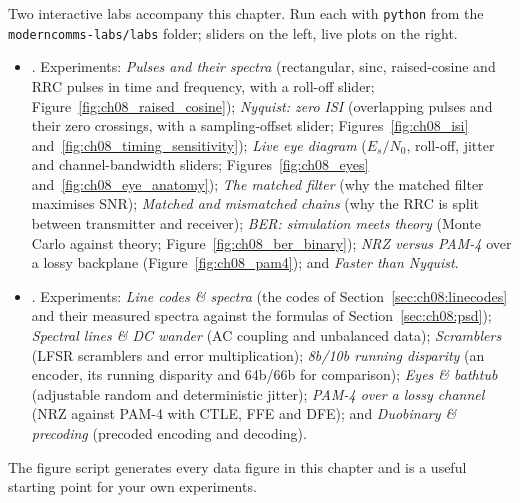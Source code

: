 \begin{labbox}
Two interactive labs accompany this chapter. Run each with \texttt{python} from the
\texttt{moderncomms-labs/labs} folder; sliders on the left, live plots on the right.
\begin{itemize}
\item {}. Experiments: \emph{Pulses and their
spectra} (rectangular, sinc, raised-cosine and RRC pulses in time and frequency, with a roll-off
slider; Figure~\ref{fig:ch08_raised_cosine}); \emph{Nyquist: zero ISI} (overlapping pulses and
their zero crossings, with a sampling-offset slider; Figures~\ref{fig:ch08_isi}
and~\ref{fig:ch08_timing_sensitivity}); \emph{Live eye diagram} ($E_s/N_0$, roll-off, jitter and
channel-bandwidth sliders; Figures~\ref{fig:ch08_eyes} and~\ref{fig:ch08_eye_anatomy});
\emph{The matched filter} (why the matched filter maximises SNR); \emph{Matched and mismatched
chains} (why the RRC is split between transmitter and receiver); \emph{BER: simulation meets
theory} (Monte Carlo against theory; Figure~\ref{fig:ch08_ber_binary}); \emph{NRZ versus PAM-4}
over a lossy backplane (Figure~\ref{fig:ch08_pam4}); and \emph{Faster than Nyquist}.
\item {}. Experiments: \emph{Line codes \&
spectra} (the codes of Section~\ref{sec:ch08:linecodes} and their measured spectra against the
formulas of Section~\ref{sec:ch08:psd}); \emph{Spectral lines \& DC wander} (AC coupling and
unbalanced data); \emph{Scramblers} (LFSR scramblers and error multiplication); \emph{8b/10b
running disparity} (an encoder, its running disparity and 64b/66b for comparison); \emph{Eyes \&
bathtub} (adjustable random and deterministic jitter); \emph{PAM-4 over a lossy channel} (NRZ
against PAM-4 with CTLE, FFE and DFE); and \emph{Duobinary \& precoding} (precoded encoding and
decoding).
\end{itemize}
The figure script  generates every data figure in this
chapter and is a useful starting point for your own experiments.
\end{labbox}

